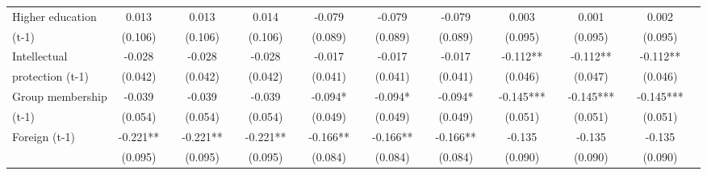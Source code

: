 \begin{table}[htbp]
\begin{tabular}{l*{18}{c}}
Higher education    &       0.013   &               &       0.013   &               &       0.014   &               &      -0.079   &               &      -0.079   &               &      -0.079   &               &       0.003   &               &       0.001   &               &       0.002   &               \\
(t-1)               &     (0.106)   &               &     (0.106)   &               &     (0.106)   &               &     (0.089)   &               &     (0.089)   &               &     (0.089)   &               &     (0.095)   &               &     (0.095)   &               &     (0.095)   &               \\
Intellectual        &      -0.028   &               &      -0.028   &               &      -0.028   &               &      -0.017   &               &      -0.017   &               &      -0.017   &               &      -0.112** &               &      -0.112** &               &      -0.112** &               \\
protection (t-1)    &     (0.042)   &               &     (0.042)   &               &     (0.042)   &               &     (0.041)   &               &     (0.041)   &               &     (0.041)   &               &     (0.046)   &               &     (0.047)   &               &     (0.046)   &               \\
Group membership    &      -0.039   &               &      -0.039   &               &      -0.039   &               &      -0.094*  &               &      -0.094*  &               &      -0.094*  &               &      -0.145***&               &      -0.145***&               &      -0.145***&               \\
(t-1)               &     (0.054)   &               &     (0.054)   &               &     (0.054)   &               &     (0.049)   &               &     (0.049)   &               &     (0.049)   &               &     (0.051)   &               &     (0.051)   &               &     (0.051)   &               \\
Foreign (t-1)       &      -0.221** &               &      -0.221** &               &      -0.221** &               &      -0.166** &               &      -0.166** &               &      -0.166** &               &      -0.135   &               &      -0.135   &               &      -0.135   &               \\
                    &     (0.095)   &               &     (0.095)   &               &     (0.095)   &               &     (0.084)   &               &     (0.084)   &               &     (0.084)   &               &     (0.090)   &               &     (0.090)   &               &     (0.090)   &               \\

\end{tabular}
\end{table}
